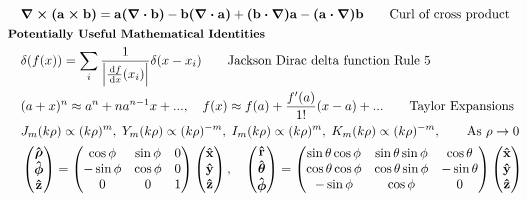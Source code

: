 \documentclass[10pt]{article}
\newcommand{\rhat}{\boldsymbol{\hat{\textbf{r}}}}
\newcommand{\xhat}{\boldsymbol{\hat{\textbf{x}}}}
\newcommand{\yhat}{\boldsymbol{\hat{\textbf{y}}}}
\newcommand{\zhat}{\boldsymbol{\hat{\textbf{z}}}}
\newcommand{\phihat}{\boldsymbol{\hat{\textbf{$\phi$}}}}
\newcommand{\thetahat}{\boldsymbol{\hat{\textbf{$\theta$}}}}
\newcommand{\rhohat}{\boldsymbol{\hat{\textbf{$\rho$}}}}
\newcommand{\ve}[1]{\boldsymbol{\mathbf{#1}}}
\newcommand{\dd}{\, \mathrm{d}}
\newcommand{\tder}[2]{\frac{\dd #1}{\dd #2}}
\begin{document}
\begin{multicols}{2}
\begin{align*}
		& \ve{\nabla \times (a \times b)} = \ve{a(\nabla \cdot b)} - \ve{b(\nabla \cdot a)} + \ve{(b \cdot \nabla)a} - \ve{(a \cdot \nabla)b}	\tag*{Curl of cross product} \\
	& \small \hspace{-10pt} \textbf{Potentially Useful Mathematical Identities} \small \\
		& \delta(f(x)) = \sum_{i} \frac{1}{\left|\tder{f}{x}(x_i)\right|}\delta(x - x_i)	\tag*{Jackson Dirac delta function Rule 5 } \\
		& (a + x)^n \approx a^n + n a^{n-1} x+..., \quad f(x) \approx f(a) + \frac{f'(a)}{1!}(x-a)+... \tag*{Taylor Expansions} \\
		& J_m(k \rho) \propto (k \rho)^m, \; Y_m(k \rho) \propto (k \rho)^{-m}, \; I_m(k \rho) \propto (k \rho)^m, \; K_m(k \rho) \propto (k \rho)^{-m}, \tag*{As $\rho \rightarrow 0$} \\
 		&\begin{pmatrix}
			\rhohat \\
			\phihat \\
			\zhat
 		\end{pmatrix} =
 		\begin{pmatrix}
 			\cos \phi & \sin \phi & 0 \\
 			-\sin \phi & \cos \phi & 0 \\
 			0 & 0 & 1 \\
 		\end{pmatrix} 
 		\begin{pmatrix}
 			\xhat \\
 			\yhat \\
 			\zhat \\
 		\end{pmatrix}, \quad
 		\begin{pmatrix}
			\rhat \\
			\thetahat \\
			\phihat
 		\end{pmatrix} =
 		\begin{pmatrix}
			\sin \theta \cos \phi & \sin \theta \sin \phi & \cos \theta\\
			\cos \theta \cos \phi & \cos \theta \sin \phi & - \sin \theta \\
			-\sin \phi & \cos \phi & 0
 		\end{pmatrix} 
 		\begin{pmatrix}
 			\xhat \\
 			\yhat \\
 			\zhat \\
 		\end{pmatrix} \\

\end{align*}
\end{multicols}
\end{document}
